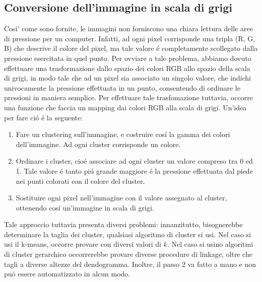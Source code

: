 \documentclass[11pt,twoside,a4paper]{article}
\begin{document}


\subsection{Conversione dell'immagine in scala di grigi}
Cosi' come sono fornite, le immagini non forniscono una chiara lettura delle aree di pressione per un computer. Infatti, ad ogni pixel corrisponde una tripla (R, G, B) che descrive il colore del pixel, ma tale valore \'e completamente scollegato dalla pressione esercitata in quel punto. Per ovviare a tale problema, abbiamo dovuto effettuare una trasformazione dallo spazio dei colori RGB allo spazio della scala di grigi, in modo tale che ad un pixel sia associato un singolo valore, che indichi univocamente la pressione effettuata in un punto, consentendo di ordinare le pressioni in maniera semplice. Per effettuare tale trasfomazione tuttavia, occorre una funzione che faccia un mapping dai colori RGB alla scala di grigi. Un'idea per fare ci\'o \'e la seguente:
\begin{enumerate}
	\item Fare un clustering sull'immagine, e costruire cos\'i la gamma dei colori dell'immagine. Ad ogni cluster corrisponde un colore.
	\item Ordinare i cluster, cio\'e associare ad ogni cluster un valore compreso tra 0 ed 1. Tale valore \'e tanto pi\'u grande maggiore \'e la pressione effettuata dal piede nei punti colorati con il colore del cluster.
	\item Sostituire ogni pixel nell'immagine con il valore assegnato al cluster, ottenendo cos\'i un'immagine in scala di grigi.
\end{enumerate}
Tale approccio tuttavia presenta diversi problemi: innanzitutto, bisognerebbe determinare la taglia dei cluster, qualsiasi algoritmo di cluster si usi. Nel caso si usi il k-means, occorre provare con diversi valori di $k$. Nel caso si usino algoritmi di cluster gerarchico occorrerebbe provare diverse procedure di linkage, oltre che tagli a diverse altezze del dendogramma. Inoltre, il passo $2$ va fatto a mano e non pu\'o essere automatizzato in alcun modo.
\end{document}
